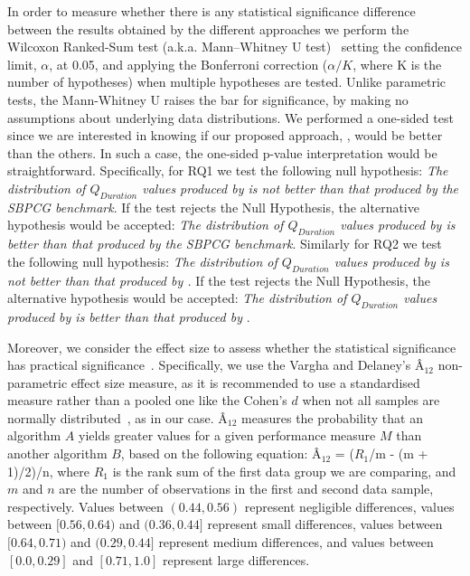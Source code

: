 In order to measure whether there is any statistical significance difference between the results obtained by the different approaches we perform the  Wilcoxon Ranked-Sum test (a.k.a. Mann–Whitney U test)~\cite{mann1947test} setting the confidence limit, $\alpha$, at 0.05, and applying the Bonferroni correction ($\alpha/K$, where K is the number of hypotheses) when multiple hypotheses are tested.  Unlike parametric tests, the Mann-Whitney U raises the bar for significance, by making no assumptions about underlying data distributions. We performed a one-sided test since we are interested in knowing if our proposed approach, \simhotep{}, would be better than the others. In such a case, the one-sided p-value interpretation would be straightforward. Specifically, for RQ1 we test the following null hypothesis: \textit{The distribution of $Q_{Duration}$ values produced by  \simhotep{}  is not better than that produced by the SBPCG benchmark}. If the test rejects the Null Hypothesis, the alternative hypothesis would be accepted: \textit{The distribution of $Q_{Duration}$ values produced by \simhotep{} is better than that produced by the SBPCG benchmark}. Similarly for RQ2 we test the following null hypothesis: \textit{The distribution of $Q_{Duration}$ values produced by  \simhotep{}  is not better than that produced by \timhotep{}.} If the test rejects the Null Hypothesis, the alternative hypothesis would be accepted: \textit{The distribution of $Q_{Duration}$ values produced by \simhotep{}  is better than that produced by \timhotep{}}.

Moreover, we consider the effect size to assess whether the statistical significance has practical significance~\cite{Arcuri2014}. Specifically, we use the Vargha and Delaney's Â$_{12}$ non-parametric effect size measure, as it is recommended to use a standardised measure rather than a pooled one like the Cohen's $d$ when not all samples are normally distributed~\cite{Arcuri2014}, as in our case.   Â$_{12}$ measures the probability that an algorithm $A$ yields greater values for a given performance measure $M$ than another algorithm $B$, based on the following equation:	Â$_{12}$ = ($R_1$/m - (m + 1)/2)/n, where $R_1$ is the rank sum of the first data group we are comparing, and $m$ and $n$ are the number of observations in the first and second data sample, respectively. Values between $(0.44, 0.56)$ represent negligible differences, values between $[0.56, 0.64)$ and $(0.36, 0.44]$ represent small differences, values between $[0.64, 0.71)$ and $(0.29, 0.44]$ represent medium differences, and values between $[0.0, 0.29]$ and $[0.71, 1.0]$ represent large differences.

